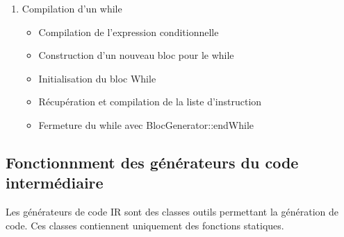 \documentclass{article}
\begin{document}
\begin{enumerate}
   \item Compilation d'un while
     \begin{itemize}
      \item Compilation de l'expression conditionnelle
      \item Construction d'un nouveau bloc pour le while
      \item Initialisation du bloc While
      \item Récupération et compilation de la liste d'instruction
      \item Fermeture du while avec BlocGenerator::endWhile 
     \end{itemize}


  \end{enumerate}

\subsection{Fonctionnment des générateurs du code intermédiaire}

   Les générateurs de code IR sont des classes outils permettant la génération de code. Ces classes contiennent uniquement des fonctions statiques.
\end{document}
